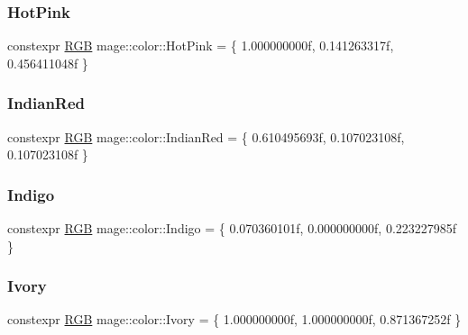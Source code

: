 \subsubsection{\texorpdfstring{Hot\+Pink}{HotPink}}
{\footnotesize\ttfamily constexpr \hyperlink{structmage_1_1_r_g_b}{R\+GB} mage\+::color\+::\+Hot\+Pink = \{ 1.\+000000000f, 0.\+141263317f, 0.\+456411048f \}}

\hypertarget{namespacemage_1_1color_ac72ec1deca799c7ea8a266178fcff437}{}\label{namespacemage_1_1color_ac72ec1deca799c7ea8a266178fcff437} 
\subsubsection{\texorpdfstring{Indian\+Red}{IndianRed}}
{\footnotesize\ttfamily constexpr \hyperlink{structmage_1_1_r_g_b}{R\+GB} mage\+::color\+::\+Indian\+Red = \{ 0.\+610495693f, 0.\+107023108f, 0.\+107023108f \}}

\hypertarget{namespacemage_1_1color_a6c11642f5d2e292242db7ae8098ad2fe}{}\label{namespacemage_1_1color_a6c11642f5d2e292242db7ae8098ad2fe} 
\subsubsection{\texorpdfstring{Indigo}{Indigo}}
{\footnotesize\ttfamily constexpr \hyperlink{structmage_1_1_r_g_b}{R\+GB} mage\+::color\+::\+Indigo = \{ 0.\+070360101f, 0.\+000000000f, 0.\+223227985f \}}

\hypertarget{namespacemage_1_1color_a523d55e266b6dd337cd2865ee29754fc}{}\label{namespacemage_1_1color_a523d55e266b6dd337cd2865ee29754fc} 
\subsubsection{\texorpdfstring{Ivory}{Ivory}}
{\footnotesize\ttfamily constexpr \hyperlink{structmage_1_1_r_g_b}{R\+GB} mage\+::color\+::\+Ivory = \{ 1.\+000000000f, 1.\+000000000f, 0.\+871367252f \}}

\hypertarget{namespacemage_1_1color_a2be9259999ab5e4e4e3c46c0c12cd5d7}{}\label{namespacemage_1_1color_a2be9259999ab5e4e4e3c46c0c12cd5d7} 
